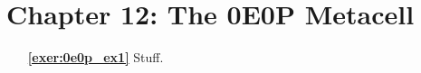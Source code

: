 \hypertarget{solutions_0e0p}{}\label{solutions_0e0p}
\section*{Chapter 12: The 0E0P Metacell}
\renewcommand{\chapterfolder}{0e0p/}

\begin{multicols}{2}
	\begin{itemize}[leftmargin=0em]
		\item[\bf\color{ocre}\sffamily\ref{exer:0e0p_ex1}] Stuff.
	\end{itemize}
\end{multicols}

\normalsize
